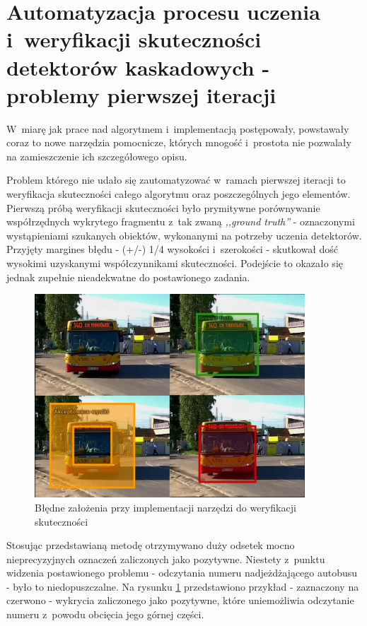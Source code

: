 \section{Automatyzacja procesu uczenia i~weryfikacji skuteczności
    detektorów kaskadowych - problemy pierwszej iteracji}

W~miarę jak prace nad algorytmem i~implementacją postępowały, powstawały
coraz to nowe narzędzia pomocnicze, których mnogość i~prostota nie
pozwalały na zamieszczenie ich szczegółowego opisu. 

Problem którego nie udało się zautomatyzować 
w~ramach pierwszej iteracji to weryfikacja skuteczności
całego algorytmu oraz poszczególnych jego elementów. Pierwszą
próbą weryfikacji skuteczności było prymitywne porównywanie współrzędnych
wykrytego fragmentu z~tak zwaną \textit{,,ground truth''} - oznaczonymi
wystąpieniami szukanych obiektów, wykonanymi na potrzeby uczenia 
detektorów. 
Przyjęty margines błędu - (+/-) 1/4 wysokości i~szerokości - skutkował dość
wysokimi uzyskanymi współczynnikami skuteczności. Podejście to okazało
się jednak zupełnie nieadekwatne do postawionego zadania.

\begin{figure}[h!]
    \centering
    \includegraphics[width=0.9\textwidth]{img/env_benchmark_fail_1}
    \caption{Błędne założenia przy implementacji narzędzi do
    weryfikacji skuteczności}
    \label{fig:autoverificationfail}
\end{figure}

Stosując przedstawianą metodę otrzymywano 
duży odsetek mocno nieprecyzyjnych oznaczeń
zaliczonych jako pozytywne. Niestety
z~punktu widzenia postawionego problemu -
odczytania numeru nadjeżdżającego autobusu - 
było to niedopuszczalne. Na rysunku 
\ref{fig:autoverificationfail} przedstawiono przykład - 
zaznaczony na czerwono - wykrycia zaliczonego
jako pozytywne, które uniemożliwia odczytanie numeru z~powodu obcięcia
jego górnej części.

